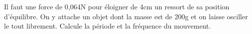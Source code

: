 %
%
    Il faut une force de 0,064N pour éloigner de 4cm un ressort de sa position d'équilibre. On y attache un objet dont la masse est de 200g et on laisse osciller le tout librement. Calcule la période et la fréquence du mouvement.
